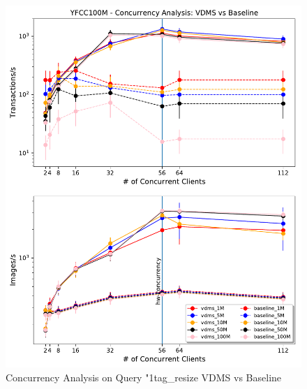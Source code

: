 \begin{figure}[]
\centering
\includegraphics[width=\columnwidth]{figures/concurrency_comparison}
\caption{Concurrency Analysis on Query "1tag\_resize\- VDMS vs Baseline}
\label{fig:concurrency_vdms}
\end{figure}




